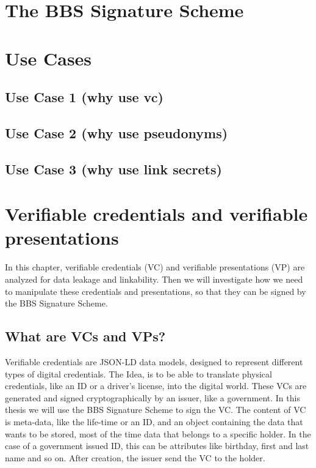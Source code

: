\documentclass[
	a4paper               %
	,BCOR=0mm            %
	,bibliography=totoc   %
	,listof=totoc         %
	,monolingual
	,twoside=false
]{bfhthesis}              %
\begin{document}
\chapter{The BBS Signature Scheme}
\label{chap:bbs}

\chapter{Use Cases}

\section{Use Case 1 (why use vc)}

\section{Use Case 2 (why use pseudonyms)}

\section{Use Case 3 (why use link secrets)}

\chapter{Verifiable credentials and verifiable presentations}
\label{chap:vpnvc}
In this chapter, verifiable credentials (VC) and verifiable presentations (VP) are analyzed for data leakage and linkability.
Then we will investigate how we need to manipulate these credentials and presentations, so that they can be signed by the BBS Signature Scheme.

\section{What are VCs and VPs?}
Verifiable credentials\cite{verifiable-credentials} are JSON-LD data models, designed to represent different types of digital credentials.
The Idea, is to be able to translate physical credentials, like an ID or a driver's license, into the digital world.
These VCs are generated and signed cryptographically by an issuer, like a government.
In this thesis we will use the BBS Signature Scheme to sign the VC.
The content of VC is meta-data, like the life-time or an ID, and an object containing the data that wants to be stored, most of the time data that belongs to a specific holder.
In the case of a government issued ID, this can be attributes like birthday, first and last name and so on.
After creation, the issuer send the VC to the holder.\\
\end{document}
